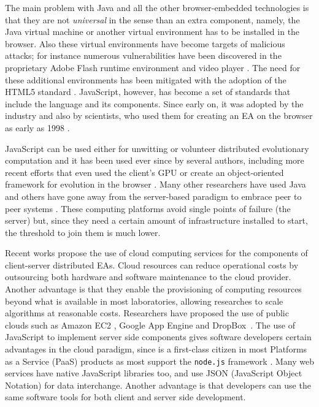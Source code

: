 \documentclass[journal,onecolumn]{IEEEtran}
\begin{document}
The main problem with Java and all the other browser-embedded
technologies is that they are not {\em universal} in the
sense than an extra component, namely, the Java virtual machine or another
virtual environment has to be installed in the browser.
Also these virtual environments have become targets of malicious attacks; 
for instance numerous vulnerabilities have been discovered in 
the proprietary Adobe Flash runtime environment and
video player \cite{ford2009analyzing,watanabe2010new}. The need for
these additional environments has been mitigated with the
adoption of the HTML5 standard \cite{anthes2012html5}.
JavaScript, however,
\cite{flanagan2006javascript} 
has become a set of standards
\cite{ECMA-262} that include the language and its components. Since
early on, it was adopted by the industry and also by scientists,
who used them for creating an EA on
the browser as early as 1998 \cite{jj-ppsn98}.

JavaScript can be used either for unwitting
\cite{unwitting-ec} or volunteer
\cite{langdon:2005:metas,gecco07:workshop:dcor} distributed
evolutionary computation and it has been used ever since by several
authors, including more recent efforts
\cite{Desell:2008:AHG:1389095.1389273,duda2013distributed,DBLP:journals/corr/abs-0801-1210} 
that even
used the client's GPU \cite{duda2013gpu} or create an object-oriented
framework for evolution in the browser \cite{EvoStar2014:jsEO}. Many other researchers have
used Java \cite{chong:1999:jDGPi} and others have gone away from the
server-based paradigm to embrace peer to peer systems
\cite{jin2006constructing,10.1109/ICICSE.2008.99,DBLP:conf/3pgcic/GuervosMFEL12}. These computing
platforms avoid single points of failure (the server) but, since they
need a certain amount of infrastructure installed to start, the
threshold to join them is much lower.

Recent works propose the use of cloud computing services for the components of
client-server distributed EAs. Cloud resources
can reduce operational costs by outsourcing both hardware and software maintenance
to the cloud provider. Another advantage is that they enable the provisioning of computing resources beyond what
is available in most laboratories, allowing researches to
scale algorithms at reasonable costs. Researchers have proposed the use of
public clouds such as Amazon EC2 \cite{CloudScale}, Google App Engine\cite{di2013towards}
and DropBox~\cite{mericloud}. The use of JavaScript to implement
server side components
gives software developers certain advantages in the cloud
paradigm, since is a first-class citizen
in most Platforms as a Service (PaaS) products as most support the {\tt node.js}
framework \cite{wood13:nodejs:paas}. Many web services
have native JavaScript libraries too, and use JSON (JavaScript Object Notation) for data
interchange. Another advantage is that
developers can use the same software tools for both client and server
side development.
\end{document}
